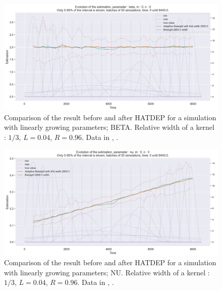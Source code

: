 \begin{figure}
\centering
\includegraphics[width = 0.90 \textwidth]{../imag/chap3/1/E.png}
\caption{Comparison of the result before and after HATDEP for a simulation with linearly growing parameters; BETA. Relative width of a kernel : $1/3$, $L = 0.04$, $R = 0.96$. Data in \protect {}, \protect {}.}
\label{fig:first_estimate_1_beta}
\end{figure}

\begin{figure}
\centering
\includegraphics[width = 0.90 \textwidth]{../imag/chap3/1/F.png}
\caption{Comparison of the result before and after HATDEP for a simulation with linearly growing parameters; NU. Relative width of a kernel : $1/3$, $L = 0.04$, $R = 0.96$. Data in \protect {}, \protect {}.}
\label{fig:first_estimate_1_nu}
\end{figure}

















